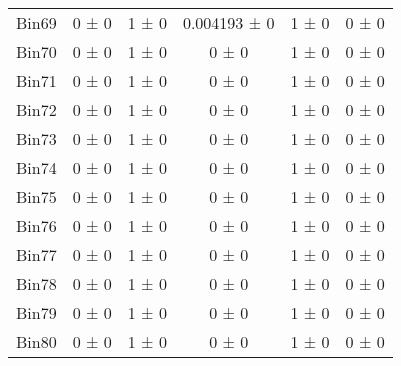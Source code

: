 \begin{tabular}{@{\extracolsep{4pt}}lccccc@{}}
     Bin69 & 0 ± 0 & 1 ± 0 & 0.004193 ± 0 & 1 ± 0 & 0 ± 0 \\ 
     Bin70 & 0 ± 0 & 1 ± 0 & 0 ± 0 & 1 ± 0 & 0 ± 0 \\ 
     Bin71 & 0 ± 0 & 1 ± 0 & 0 ± 0 & 1 ± 0 & 0 ± 0 \\ 
     Bin72 & 0 ± 0 & 1 ± 0 & 0 ± 0 & 1 ± 0 & 0 ± 0 \\ 
     Bin73 & 0 ± 0 & 1 ± 0 & 0 ± 0 & 1 ± 0 & 0 ± 0 \\ 
     Bin74 & 0 ± 0 & 1 ± 0 & 0 ± 0 & 1 ± 0 & 0 ± 0 \\ 
     Bin75 & 0 ± 0 & 1 ± 0 & 0 ± 0 & 1 ± 0 & 0 ± 0 \\ 
     Bin76 & 0 ± 0 & 1 ± 0 & 0 ± 0 & 1 ± 0 & 0 ± 0 \\ 
     Bin77 & 0 ± 0 & 1 ± 0 & 0 ± 0 & 1 ± 0 & 0 ± 0 \\ 
     Bin78 & 0 ± 0 & 1 ± 0 & 0 ± 0 & 1 ± 0 & 0 ± 0 \\ 
     Bin79 & 0 ± 0 & 1 ± 0 & 0 ± 0 & 1 ± 0 & 0 ± 0 \\ 
     Bin80 & 0 ± 0 & 1 ± 0 & 0 ± 0 & 1 ± 0 & 0 ± 0 \\ 
\hline\hline
  \end{tabular}
